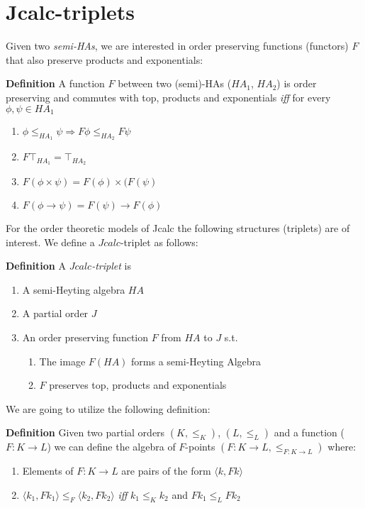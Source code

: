 \section{Jcalc-triplets}
Given two \emph{semi-HAs}, we are 
interested in order preserving 
functions (functors) $F$ that also preserve products and exponentials: 
\begin{mdframed}
    \textbf{Definition}
A function $F$ between two (semi)-HAs ($HA_1$, $HA_2$) is order preserving
and commutes with top, products and exponentials \emph{iff} for every 
$\phi,\psi \in HA_1$
    \begin{enumerate}
    \item $\phi\le_{HA_1}\psi\Rightarrow F\phi\le_{HA_2}F\psi$
    \item $F\top_{HA_1} = \top_{HA_2}$ 
    \item{$F(\phi \times\psi) = F(\phi)\times(F(\psi)$} 
    \item $F(\phi\rightarrow \psi) = F(\psi)\rightarrow F(\phi)$
    \end{enumerate}
\end{mdframed}

For the order theoretic models of  Jcalc  the following structures (triplets) 
are of interest. We define a $Jcalc$-triplet as follows:
\begin{mdframed}
    \textbf{Definition}
A \emph{$Jcalc$-triplet} is 
    
\begin{enumerate}
\item A semi-Heyting algebra $HA$
\item A partial order $J$
\item An order preserving function $F$ from $HA$ to $J$ s.t.
\begin{enumerate}
    \item The image $F(HA)$ forms a semi-Heyting Algebra
    \item $F$ preserves top, products and exponentials
\end{enumerate}
\end{enumerate}
\end{mdframed}

We are going to utilize the following definition: 

\begin{mdframed}
    \textbf{Definition}
    Given two partial orders $(K,\le_{K})$, $(L,\le_{L})$ and a function ($F: K\rightarrow L$) 
    we can define the algebra of $F$-points  $(F:K \rightarrow L,\le_{F:K\rightarrow L})$
    where:
    \begin{enumerate}
        \item Elements of $F:K\rightarrow L$ are  pairs of the form $\langle k,Fk \rangle$
        \item $\langle k_1,Fk_1 \rangle \le_F \langle k_2, Fk_2\rangle$ \textit{iff}  $k_1\le_{K}k_2$ and $Fk_1\le_{L}Fk_2$ 
    \end{enumerate}
\end{mdframed}

